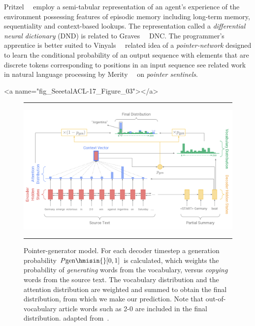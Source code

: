 Pritzel~\etal{}~\cite{PritzeletalCoRR-17} employ a semi-tabular representation of an agent's experience of the environment possessing features of episodic memory including long-term memory, sequentiality and context-based lookups. The representation called a {\it{differential neural dictionary}} (DND) is related to Graves~\etal{}~\cite{GravesetalNATURE-16} DNC. The programmer's apprentice is better suited to Vinyals~\etal{}~\cite{VinyalsetalNIPS-15} related idea of a {\it{pointer-network}} designed to learn the conditional probability of an output sequence with elements that are discrete tokens corresponding to positions in an input sequence \emdash{} see related work in natural language processing by Merity~\etal{}~\cite{MerityetalCoRR-16} on {\it{pointer sentinels}}.


\setcounter{figure}{1}


\rawhtml
<a name="fig_SeeetalACL-17_Figure_03"></a>
\endrawhtml
\begin{figure}
%
  \hrule{}
%
  \begin{center}
    \includegraphics[width=11.0in]{./figures/SeeetalACL-17_Figure_03.png}
  \end{center}
%
  \caption{Pointer-generator model. For each decoder timestep a generation probability $P\mbox{\rm{gen}} \hmisin{} [0, 1]$ is calculated, which weights the probability of {\it{generating}} words from the vocabulary, versus {\it{copying}} words from the source text. The vocabulary distribution and the attention distribution are weighted and summed to obtain the final distribution, from which we make our prediction. Note that out-of-vocabulary article words such as 2-0 are included in the final distribution. \emdash{} adapted from~\cite{SeeetalACL-17}.}
%
  \hrule{}
%
\end{figure}

